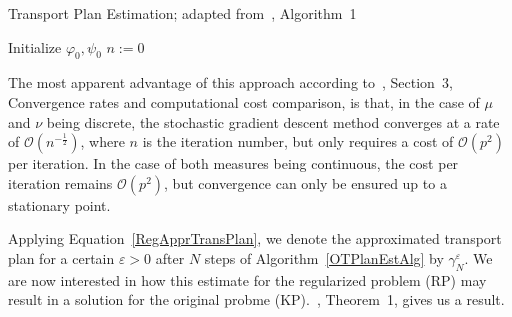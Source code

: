 \begin{algorithm}\label{OTPlanEstAlg}
	\caption{Transport Plan Estimation; adapted from~\cite{Seg2018}, Algorithm~1}
	Initialize $\varphi_0, \psi_0$\;
	$n := 0$\;
\end{algorithm}

The most apparent advantage of this approach according to~\cite{Seg2018}, Section~3, Convergence rates and computational cost comparison, is that, in the case of $\mu$ and $\nu$ being discrete, the stochastic gradient descent method converges at a rate of $\mathcal{O}\left( n^{-\frac{1}{2}} \right)$, where $n$ is the iteration number, but only requires a cost of $\mathcal{O}(p^2)$ per iteration. In the case of both measures being continuous, the cost per iteration remains $\mathcal{O}(p^2)$, but convergence can only be ensured up to a stationary point.

Applying Equation~\ref{RegApprTransPlan}, we denote the approximated transport plan for a certain $\varepsilon > 0$ after $N$ steps of Algorithm~\ref{OTPlanEstAlg} by $\gamma_N^\varepsilon$. We are now interested in how this estimate for the regularized problem (RP) may result in a solution for the original probme (KP).\@~\cite{Seg2018}, Theorem~1, gives us a result.



